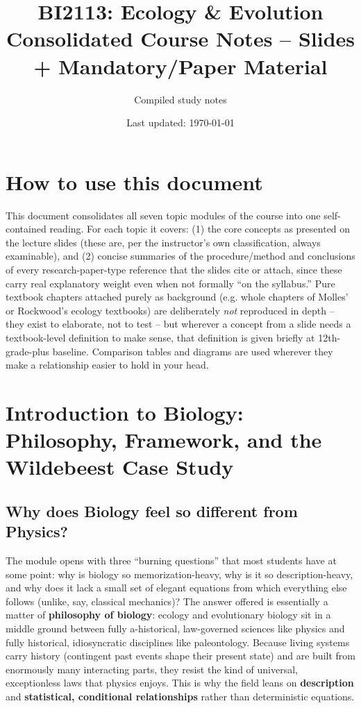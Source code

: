 \documentclass[11pt,a4paper]{article}
\title{\textbf{BI2113: Ecology \& Evolution \\ \large Consolidated Course Notes -- Slides + Mandatory/Paper Material}}
\author{Compiled study notes}
\date{Last updated: \today}
\begin{document}
\maketitle

\section*{How to use this document}
This document consolidates all seven topic modules of the course into one self-contained reading. For each topic it covers: (1) the core concepts as presented on the lecture slides (these are, per the instructor's own classification, always examinable), and (2) concise summaries of the procedure/method and conclusions of every research-paper-type reference that the slides cite or attach, since these carry real explanatory weight even when not formally ``on the syllabus.'' Pure textbook chapters attached purely as background (e.g. whole chapters of Molles' or Rockwood's ecology textbooks) are deliberately \emph{not} reproduced in depth -- they exist to elaborate, not to test -- but wherever a concept from a slide needs a textbook-level definition to make sense, that definition is given briefly at 12th-grade-plus baseline. Comparison tables and diagrams are used wherever they make a relationship easier to hold in your head.

\tableofcontents
\newpage

\section{Introduction to Biology: Philosophy, Framework, and the Wildebeest Case Study}

\subsection{Why does Biology feel so different from Physics?}
The module opens with three ``burning questions'' that most students have at some point: why is biology so memorization-heavy, why is it so description-heavy, and why does it lack a small set of elegant equations from which everything else follows (unlike, say, classical mechanics)? The answer offered is essentially a matter of \textbf{philosophy of biology}: ecology and evolutionary biology sit in a middle ground between fully a-historical, law-governed sciences like physics and fully historical, idiosyncratic disciplines like paleontology. Because living systems carry history (contingent past events shape their present state) and are built from enormously many interacting parts, they resist the kind of universal, exceptionless laws that physics enjoys. This is why the field leans on \textbf{description} and \textbf{statistical, conditional relationships} rather than deterministic equations.
\end{document}
